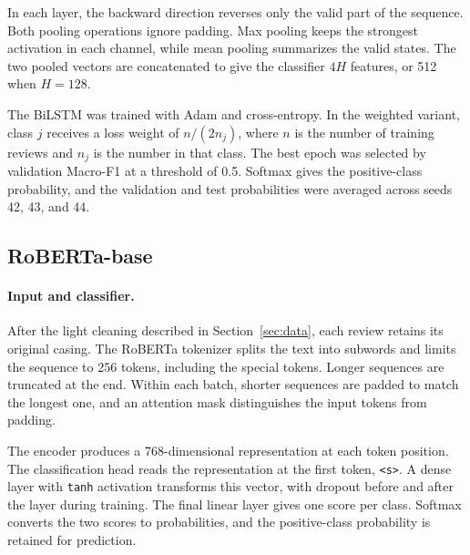 In each layer, the backward direction reverses only the valid part of
the sequence. Both pooling operations ignore padding. Max pooling
keeps the strongest activation in each channel, while mean pooling
summarizes the valid states. The two pooled vectors are concatenated
to give the classifier $4H$ features, or 512 when $H=128$.

The BiLSTM was trained with Adam and cross-entropy. In the weighted
variant, class $j$ receives a loss weight of $n/(2n_j)$, where $n$ is
the number of training reviews and $n_j$ is the number in that class.
The best epoch was selected by validation Macro-F1 at a threshold of
0.5. Softmax gives the positive-class probability, and the validation
and test probabilities were averaged across seeds 42, 43, and 44.

\subsection{RoBERTa-base}

\paragraph{Input and classifier.}
After the light cleaning described in Section~\ref{sec:data}, each review retains its
original casing. The RoBERTa tokenizer splits the text into subwords
and limits the sequence to 256 tokens, including the special tokens.
Longer sequences are truncated at the end. Within each batch, shorter
sequences are padded to match the longest one, and an attention mask
distinguishes the input tokens from padding.

The encoder produces a 768-dimensional representation at each token
position. The classification head reads the representation at the
first token, \texttt{\textless s\textgreater}. A dense layer with
\texttt{tanh} activation transforms this vector, with dropout before
and after the layer during training. The final linear layer gives
one score per class. Softmax converts the two scores to probabilities,
and the positive-class probability is retained for prediction.

